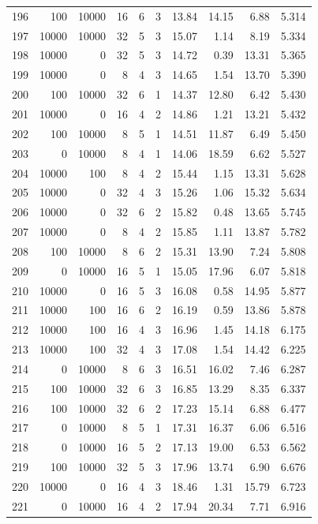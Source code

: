 \begin{footnotesize}
\begin{longtable}{@{}rrrrrrrrrr@{}}
196 & 100 & 10000 & 16 & 6 & 3 & 13.84 & 14.15 & 6.88 & 5.314 \\
197 & 10000 & 10000 & 32 & 5 & 3 & 15.07 & 1.14 & 8.19 & 5.334 \\
198 & 10000 & 0 & 32 & 5 & 3 & 14.72 & 0.39 & 13.31 & 5.365 \\
199 & 10000 & 0 & 8 & 4 & 3 & 14.65 & 1.54 & 13.70 & 5.390 \\
200 & 100 & 10000 & 32 & 6 & 1 & 14.37 & 12.80 & 6.42 & 5.430 \\
201 & 10000 & 0 & 16 & 4 & 2 & 14.86 & 1.21 & 13.21 & 5.432 \\
202 & 100 & 10000 & 8 & 5 & 1 & 14.51 & 11.87 & 6.49 & 5.450 \\
203 & 0 & 10000 & 8 & 4 & 1 & 14.06 & 18.59 & 6.62 & 5.527 \\
204 & 10000 & 100 & 8 & 4 & 2 & 15.44 & 1.15 & 13.31 & 5.628 \\
205 & 10000 & 0 & 32 & 4 & 3 & 15.26 & 1.06 & 15.32 & 5.634 \\
206 & 10000 & 0 & 32 & 6 & 2 & 15.82 & 0.48 & 13.65 & 5.745 \\
207 & 10000 & 0 & 8 & 4 & 2 & 15.85 & 1.11 & 13.87 & 5.782 \\
208 & 100 & 10000 & 8 & 6 & 2 & 15.31 & 13.90 & 7.24 & 5.808 \\
209 & 0 & 10000 & 16 & 5 & 1 & 15.05 & 17.96 & 6.07 & 5.818 \\
210 & 10000 & 0 & 16 & 5 & 3 & 16.08 & 0.58 & 14.95 & 5.877 \\
211 & 10000 & 100 & 16 & 6 & 2 & 16.19 & 0.59 & 13.86 & 5.878 \\
212 & 10000 & 100 & 16 & 4 & 3 & 16.96 & 1.45 & 14.18 & 6.175 \\
213 & 10000 & 100 & 32 & 4 & 3 & 17.08 & 1.54 & 14.42 & 6.225 \\
214 & 0 & 10000 & 8 & 6 & 3 & 16.51 & 16.02 & 7.46 & 6.287 \\
215 & 100 & 10000 & 32 & 6 & 3 & 16.85 & 13.29 & 8.35 & 6.337 \\
216 & 100 & 10000 & 32 & 6 & 2 & 17.23 & 15.14 & 6.88 & 6.477 \\
217 & 0 & 10000 & 8 & 5 & 1 & 17.31 & 16.37 & 6.06 & 6.516 \\
218 & 0 & 10000 & 16 & 5 & 2 & 17.13 & 19.00 & 6.53 & 6.562 \\
219 & 100 & 10000 & 32 & 5 & 3 & 17.96 & 13.74 & 6.90 & 6.676 \\
220 & 10000 & 0 & 16 & 4 & 3 & 18.46 & 1.31 & 15.79 & 6.723 \\
221 & 0 & 10000 & 16 & 4 & 2 & 17.94 & 20.34 & 7.71 & 6.916 \\

\end{longtable}
\end{footnotesize}
